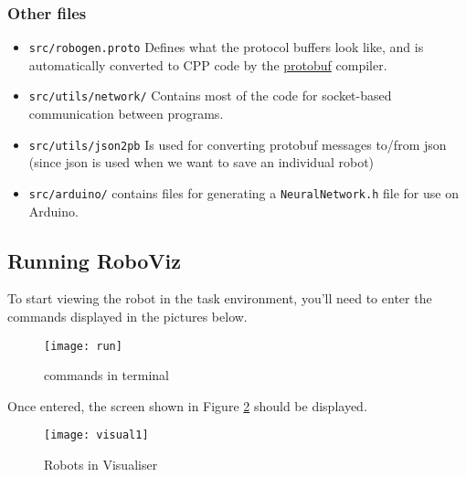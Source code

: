 \hypertarget{other-files}{%
\subsubsection{Other files}\label{other-files}}

\begin{itemize}
\item
  \texttt{src/robogen.proto} Defines what the protocol buffers look
  like, and is automatically converted to CPP code by the
  \href{https://developers.google.com/protocol-buffers/docs/cpptutorial}{protobuf}
  compiler.
\item
  \texttt{src/utils/network/} Contains most of the code for socket-based
  communication between programs.
\item
  \texttt{src/utils/json2pb} Is used for converting protobuf messages
  to/from json (since json is used when we want to save an individual
  robot)
\item
  \texttt{src/arduino/} contains files for generating a
  \texttt{NeuralNetwork.h} file for use on Arduino.
\end{itemize}

\subsection{Running RoboViz}
\label{s:runningroboviz}

To start viewing the robot in the task environment, you'll need to enter the
commands displayed in the pictures below.
\begin{figure}[htpb]
    \centering
    \texttt{[image: run]}
    \caption{commands in terminal }
    \label{fig:commands-in-terminal}
\end{figure}

Once entered, the screen shown in Figure \ref{fig:robots-in-visualiser} should
be displayed.
\begin{figure}[htpb]
    \centering
    \texttt{[image: visual1]}
    \caption{Robots in Visualiser}
    \label{fig:robots-in-visualiser}
\end{figure}

